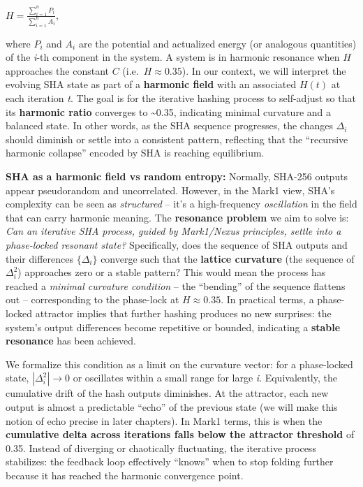 \documentclass[11pt]{article}
\begin{document}
\(H = \frac{\sum_{i=1}^n P_i}{\sum_{i=1}^n A_i},\)

where \(P_i\) and \(A_i\) are the potential and actualized energy (or
analogous quantities) of the \emph{i}-th component in the system. A
system is in harmonic resonance when \(H\) approaches the constant \(C\)
(i.e.~\(H \approx 0.35\)). In our context, we will interpret the
evolving SHA state as part of a \textbf{harmonic field} with an
associated \(H(t)\) at each iteration \emph{t}. The goal is for the
iterative hashing process to self-adjust so that its \textbf{harmonic
ratio} converges to \textasciitilde0.35, indicating minimal curvature
and a balanced state. In other words, as the SHA sequence progresses,
the changes \(\Delta_i\) should diminish or settle into a consistent
pattern, reflecting that the ``recursive harmonic collapse'' encoded by
SHA is reaching equilibrium.

\textbf{SHA as a harmonic field vs random entropy:} Normally, SHA-256
outputs appear pseudorandom and uncorrelated. However, in the Mark1
view, SHA's complexity can be seen as \emph{structured} -- it's a
high-frequency \emph{oscillation} in the field that can carry harmonic
meaning. The \textbf{resonance problem} we aim to solve is: \emph{Can an
iterative SHA process, guided by Mark1/Nexus principles, settle into a
phase-locked resonant state?} Specifically, does the sequence of SHA
outputs and their differences \(\{\Delta_i\}\) converge such that the
\textbf{lattice curvature} (the sequence of \(\Delta^2_i\)) approaches
zero or a stable pattern? This would mean the process has reached a
\emph{minimal curvature condition} -- the ``bending'' of the sequence
flattens out -- corresponding to the phase-lock at \(H \approx 0.35\).
In practical terms, a phase-locked attractor implies that further
hashing produces no new surprises: the system's output differences
become repetitive or bounded, indicating a \textbf{stable resonance} has
been achieved.

We formalize this condition as a limit on the curvature vector: for a
phase-locked state, \(|\Delta^2_i| \to 0\) or oscillates within a small
range for large \emph{i}. Equivalently, the cumulative drift of the hash
outputs diminishes. At the attractor, each new output is almost a
predictable ``echo'' of the previous state (we will make this notion of
echo precise in later chapters). In Mark1 terms, this is when the
\textbf{cumulative delta across iterations falls below the attractor
threshold} of 0.35. Instead of diverging or chaotically fluctuating, the
iterative process stabilizes: the feedback loop effectively ``knows''
when to stop folding further because it has reached the harmonic
convergence point.
\end{document}
